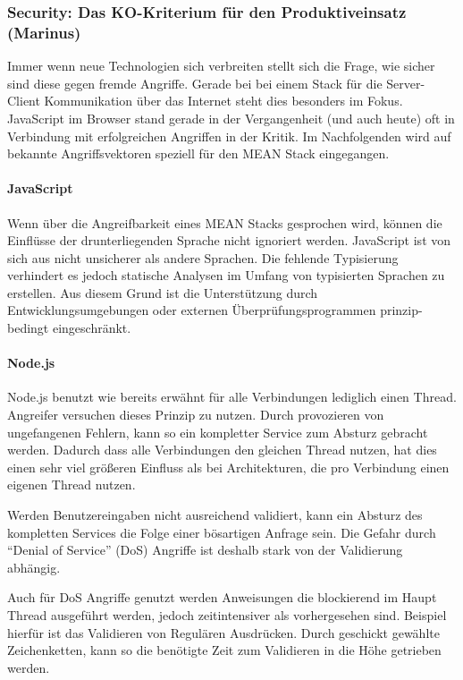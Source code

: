 \subsubsection{Security: Das KO-Kriterium für den Produktiveinsatz
(Marinus)}\label{security-das-ko-kriterium-fuxfcr-den-produktiveinsatz-marinus}

Immer wenn neue Technologien sich verbreiten stellt sich die Frage, wie
sicher sind diese gegen fremde Angriffe. Gerade bei bei einem Stack für
die Server-Client Kommunikation über das Internet steht dies besonders
im Fokus. JavaScript im Browser stand gerade in der Vergangenheit (und
auch heute) oft in Verbindung mit erfolgreichen Angriffen in der Kritik.
Im Nachfolgenden wird auf bekannte Angriffsvektoren speziell für den
MEAN Stack eingegangen.

\paragraph{JavaScript}\label{javascript}

Wenn über die Angreifbarkeit eines MEAN Stacks gesprochen wird, können
die Einflüsse der drunterliegenden Sprache nicht ignoriert werden.
JavaScript ist von sich aus nicht unsicherer als andere Sprachen. Die
fehlende Typisierung verhindert es jedoch statische Analysen im Umfang
von typisierten Sprachen zu erstellen. Aus diesem Grund ist die
Unterstützung durch Entwicklungsumgebungen oder externen
Überprüfungsprogrammen prinzip-bedingt eingeschränkt.

\paragraph{Node.js}\label{node.js}

Node.js benutzt wie bereits erwähnt für alle Verbindungen lediglich
einen Thread. Angreifer versuchen dieses Prinzip zu nutzen. Durch
provozieren von ungefangenen Fehlern, kann so ein kompletter Service zum
Absturz gebracht werden. Dadurch dass alle Verbindungen den gleichen
Thread nutzen, hat dies einen sehr viel größeren Einfluss als bei
Architekturen, die pro Verbindung einen eigenen Thread nutzen.

Werden Benutzereingaben nicht ausreichend validiert, kann ein Absturz
des kompletten Services die Folge einer bösartigen Anfrage sein. Die
Gefahr durch ``Denial of Service'' (DoS) Angriffe ist deshalb stark von
der Validierung abhängig.

Auch für DoS Angriffe genutzt werden Anweisungen die blockierend im
Haupt Thread ausgeführt werden, jedoch zeitintensiver als vorhergesehen
sind. Beispiel hierfür ist das Validieren von Regulären Ausdrücken.
Durch geschickt gewählte Zeichenketten, kann so die benötigte Zeit zum
Validieren in die Höhe getrieben werden.

